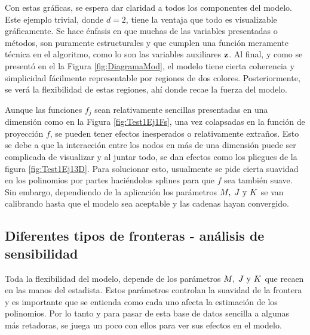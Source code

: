 \documentclass[../Main/Main.tex]{subfiles}
\begin{document}
Con estas gráficas, se espera dar claridad a todos los componentes del modelo. Este ejemplo trivial, donde $d = 2$, tiene la ventaja que todo es visualizable gráficamente. Se hace énfasis en que muchas de las variables presentadas o métodos, son puramente estructurales y que cumplen una función meramente técnica en el algoritmo, como lo son las variables auxiliares $\mathbf{z}$. Al final, y como se presentó en el la Figura \ref{fig:DiagramaMod}, el modelo tiene cierta coherencia y simplicidad fácilmente representable por regiones de dos colores. Posteriormente, se verá la flexibilidad de estas regiones, ahí donde recae la fuerza del modelo.

Aunque las funciones $f_j$ sean relativamente sencillas presentadas en una dimensión como en la Figura \ref{fig:Test1Ej1Fs}, una vez colapsadas en la función de proyección $f$, se pueden tener efectos inesperados o relativamente extraños. Esto se debe a que la interacción entre los nodos en más de una dimensión puede ser complicada de visualizar y al juntar todo, se dan efectos como los pliegues de la figura \ref{fig:Test1Ej13D}. Para solucionar esto, usualmente se pide cierta suavidad en los polinomios por partes haciéndolos splines para que $f$ sea también suave. Sin embargo, dependiendo de la aplicación los parámetros $M,\;J\text{ y }K$ se van calibrando hasta que el modelo sea aceptable y las cadenas hayan convergido. 

\subsection{Diferentes tipos de fronteras - análisis de sensibilidad } \label{sec:AnlisisSensibilidad}
Toda la flexibilidad del modelo, depende de los parámetros $M,\;J\text{ y }K$ que recaen en las manos del estadista. Estos parámetros controlan la suavidad de la frontera y es importante que se entienda como cada uno afecta la estimación de los polinomios. Por lo tanto y para pasar de esta base de datos sencilla a algunas más retadoras, se juega un poco con ellos para ver sus efectos en el modelo. 
\end{document}
